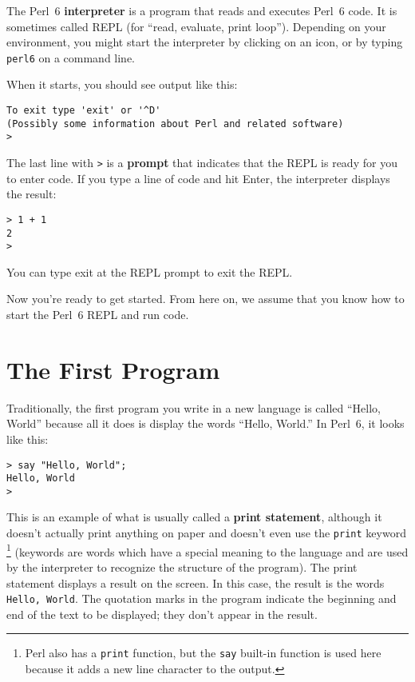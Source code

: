 The Perl~6 {\bf interpreter} is a program that reads and 
executes Perl~6 code. It is sometimes called REPL (for ``read, 
evaluate, print loop''). Depending on your environment, you 
might start the interpreter by clicking on an icon, or by 
typing {\tt perl6} on a command line.

When it starts, you should see output like this:

\begin{verbatim}
To exit type 'exit' or '^D'
(Possibly some information about Perl and related software)
> 
\end{verbatim}
%

The last line with {\tt >} is a {\bf prompt} that indicates 
that the REPL is ready for you to enter code. If you type a 
line of code and hit Enter, the interpreter displays the
result: 

\begin{verbatim}
> 1 + 1
2
>
\end{verbatim}
%
You can type exit at the REPL prompt to exit the REPL.

Now you're ready to get started.
From here on, we assume that you know how to start the Perl~6
REPL and run code.


\section{The First Program}
\label{hello}

Traditionally, the first program you write in a new language
is called ``Hello, World'' because all it does is display the
words ``Hello, World.''  In Perl~6, it looks like this:

\begin{verbatim}
> say "Hello, World";
Hello, World
>
\end{verbatim}
%
This is an example of what is usually called a {\bf print statement}, although it
doesn't actually print anything on paper and doesn't even 
use the {\tt print} keyword \footnote{Perl also has a {\tt print} 
function, but the {\tt say} built-in function is used here 
because it adds a new line character to the output.} (keywords are 
words which have a special meaning to the language and are 
used by the interpreter to recognize the structure of the program).  
The print statement displays a result on the screen.  In this case, 
the result is the words {\tt Hello, World}.
%
The quotation marks in the program indicate the beginning and end
of the text to be displayed; they don't appear in the result.

